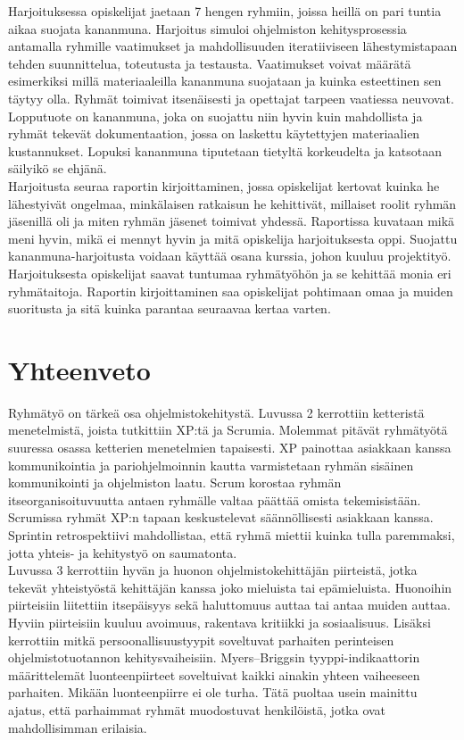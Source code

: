 \documentclass[finnish]{../tktltiki2}
\theoremstyle{definition}
\theoremstyle{remark}
\begin{document}
\begin{itemize}
Harjoituksessa opiskelijat jaetaan 7 hengen ryhmiin, joissa heillä on pari tuntia aikaa suojata kananmuna. Harjoitus simuloi ohjelmiston kehitysprosessia antamalla ryhmille vaatimukset ja mahdollisuuden iteratiiviseen lähestymistapaan tehden suunnittelua, toteutusta ja testausta. Vaatimukset voivat määrätä esimerkiksi millä materiaaleilla kananmuna suojataan ja kuinka esteettinen sen täytyy olla. Ryhmät toimivat itsenäisesti ja opettajat tarpeen vaatiessa neuvovat. Lopputuote on kananmuna, joka on suojattu niin hyvin kuin mahdollista ja ryhmät tekevät dokumentaation, jossa on laskettu käytettyjen materiaalien kustannukset. Lopuksi kananmuna tiputetaan tietyltä korkeudelta ja katsotaan säilyikö se ehjänä.\\

Harjoitusta seuraa raportin kirjoittaminen, jossa opiskelijat kertovat kuinka he lähestyivät ongelmaa, minkälaisen ratkaisun he kehittivät, millaiset roolit ryhmän jäsenillä oli ja miten ryhmän jäsenet toimivat yhdessä. Raportissa kuvataan mikä meni hyvin, mikä ei mennyt hyvin ja mitä opiskelija harjoituksesta oppi. Suojattu kananmuna-harjoitusta voidaan käyttää osana kurssia, johon kuuluu projektityö. Harjoituksesta opiskelijat saavat tuntumaa ryhmätyöhön ja se kehittää monia eri ryhmätaitoja. Raportin kirjoittaminen saa opiskelijat pohtimaan omaa ja muiden suoritusta ja sitä kuinka parantaa seuraavaa kertaa varten.

\end{itemize}

\section{Yhteenveto}

Ryhmätyö on tärkeä osa ohjelmistokehitystä. Luvussa 2 kerrottiin ketteristä menetelmistä, joista tutkittiin XP:tä ja Scrumia. Molemmat pitävät ryhmätyötä suuressa osassa ketterien menetelmien tapaisesti. XP painottaa asiakkaan kanssa kommunikointia ja pariohjelmoinnin kautta varmistetaan ryhmän sisäinen kommunikointi ja ohjelmiston laatu. Scrum korostaa ryhmän itseorganisoituvuutta antaen ryhmälle valtaa päättää omista tekemisistään. Scrumissa ryhmät XP:n tapaan keskustelevat säännöllisesti asiakkaan kanssa. Sprintin retrospektiivi mahdollistaa, että ryhmä miettii kuinka tulla paremmaksi, jotta yhteis- ja kehitystyö on saumatonta.\\

Luvussa 3 kerrottiin hyvän ja huonon ohjelmistokehittäjän piirteistä, jotka tekevät yhteistyöstä kehittäjän kanssa joko mieluista tai epämieluista. Huonoihin piirteisiin liitettiin itsepäisyys sekä haluttomuus auttaa tai antaa muiden auttaa. Hyviin piirteisiin kuuluu avoimuus, rakentava kritiikki ja sosiaalisuus. Lisäksi kerrottiin mitkä persoonallisuustyypit soveltuvat parhaiten perinteisen ohjelmistotuotannon kehitysvaiheisiin. Myers--Briggsin tyyppi-indikaattorin määrittelemät luonteenpiirteet soveltuivat kaikki ainakin yhteen vaiheeseen parhaiten. Mikään luonteenpiirre ei ole turha. Tätä puoltaa usein mainittu ajatus, että parhaimmat ryhmät muodostuvat henkilöistä, jotka ovat mahdollisimman erilaisia.\\
\end{document}
